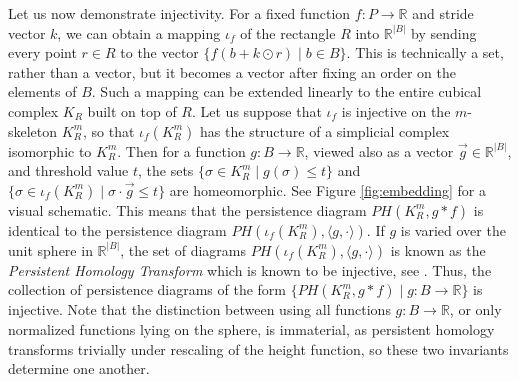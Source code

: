 \documentclass[conference]{IEEEtran}
\theoremstyle{definition}
\numberwithin{figure}{section}
\begin{document}
\newpage

Let us now demonstrate injectivity. For a fixed function $f:P \to \mathbb{R}$ and stride vector $k$, we can obtain a mapping $\iota_{f}$ of the rectangle $R$ into $\mathbb{R}^{|B|}$ by sending every point $r \in R$ to the vector $\{f(b + k \odot r) \mid b \in B\}$. This is technically a set, rather than a vector, but it becomes a vector after fixing an order on the elements of $B$. Such a mapping can be extended linearly to the entire cubical complex $K_{R}$ built on top of $R$. Let us suppose that $\iota_{f}$ is injective on the $m$-skeleton $K_{R}^m$, so that $\iota_{f}(K_{R}^m)$ has the structure of a simplicial complex isomorphic to $K_{R}^m$. Then for a function $g: B \to \mathbb{R}$, viewed also as a vector $\vec{g} \in \mathbb{R}^{|B|}$, and threshold value $t$, the sets $\{\sigma \in K_{R}^{m} \mid g(\sigma) \leq t\}$ and $\{\sigma \in \iota_{f}(K_{R}^m) \mid \sigma \cdot \vec{g} \leq t \}$ are homeomorphic. See Figure \ref{fig:embedding} for a visual schematic. This means that the persistence diagram $PH(K_{R}^m,g \ast f)$ is identical to the persistence diagram $PH(\iota_{f}(K_{R}^m),\langle g, \cdot \rangle)$. If $g$ is varied over the unit sphere in $\mathbb{R}^{|B|}$, the set of diagrams $PH(\iota_{f}(K_{R}^m),\langle g, \cdot \rangle)$ is known as the \emph{Persistent Homology Transform} which is known to be injective, see \cite{turner2014persistent,ghrist2018persistent,curry2018many}. Thus, the collection of persistence diagrams of the form $\{PH(K_{R}^m, g \ast f) \mid g : B \to \mathbb{R}\}$ is injective. Note that the distinction between using all functions $g: B \to \mathbb{R}$, or only normalized functions lying on the sphere, is immaterial, as persistent homology transforms trivially under rescaling of the height function, so these two invariants determine one another.\\ 
\end{document}
